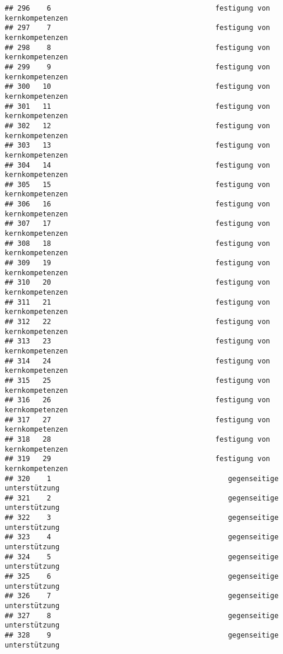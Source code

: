 \documentclass[
]{article}
\begin{document}
\begin{verbatim}
## 296    6                                       festigung von kernkompetenzen
## 297    7                                       festigung von kernkompetenzen
## 298    8                                       festigung von kernkompetenzen
## 299    9                                       festigung von kernkompetenzen
## 300   10                                       festigung von kernkompetenzen
## 301   11                                       festigung von kernkompetenzen
## 302   12                                       festigung von kernkompetenzen
## 303   13                                       festigung von kernkompetenzen
## 304   14                                       festigung von kernkompetenzen
## 305   15                                       festigung von kernkompetenzen
## 306   16                                       festigung von kernkompetenzen
## 307   17                                       festigung von kernkompetenzen
## 308   18                                       festigung von kernkompetenzen
## 309   19                                       festigung von kernkompetenzen
## 310   20                                       festigung von kernkompetenzen
## 311   21                                       festigung von kernkompetenzen
## 312   22                                       festigung von kernkompetenzen
## 313   23                                       festigung von kernkompetenzen
## 314   24                                       festigung von kernkompetenzen
## 315   25                                       festigung von kernkompetenzen
## 316   26                                       festigung von kernkompetenzen
## 317   27                                       festigung von kernkompetenzen
## 318   28                                       festigung von kernkompetenzen
## 319   29                                       festigung von kernkompetenzen
## 320    1                                          gegenseitige unterstützung
## 321    2                                          gegenseitige unterstützung
## 322    3                                          gegenseitige unterstützung
## 323    4                                          gegenseitige unterstützung
## 324    5                                          gegenseitige unterstützung
## 325    6                                          gegenseitige unterstützung
## 326    7                                          gegenseitige unterstützung
## 327    8                                          gegenseitige unterstützung
## 328    9                                          gegenseitige unterstützung

\end{verbatim}
\end{document}
